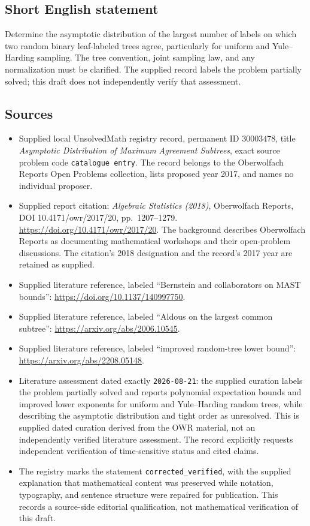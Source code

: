 \documentclass[11pt]{article}
\begin{document}
\subsection{Short English statement}
Determine the asymptotic distribution of the largest number of labels on which two random binary leaf-labeled trees agree, particularly for uniform and Yule--Harding sampling. The tree convention, joint sampling law, and any normalization must be clarified. The supplied record labels the problem partially solved; this draft does not independently verify that assessment.
\subsection{Sources}
\begin{itemize}
\item Supplied local UnsolvedMath registry record, permanent ID \(30003478\), title \emph{Asymptotic Distribution of Maximum Agreement Subtrees}, exact source problem code \texttt{catalogue entry}. The record belongs to the Oberwolfach Reports Open Problems collection, lists proposed year 2017, and names no individual proposer.
\item Supplied report citation: \emph{Algebraic Statistics (2018)}, Oberwolfach Reports, DOI 10.4171/owr/2017/20, pp.\ 1207--1279. \url{https://doi.org/10.4171/owr/2017/20}. The background describes Oberwolfach Reports as documenting mathematical workshops and their open-problem discussions. The citation's 2018 designation and the record's 2017 year are retained as supplied.
\item Supplied literature reference, labeled ``Bernstein and collaborators on MAST bounds'': \url{https://doi.org/10.1137/140997750}.
\item Supplied literature reference, labeled ``Aldous on the largest common subtree'': \url{https://arxiv.org/abs/2006.10545}.
\item Supplied literature reference, labeled ``improved random-tree lower bound'': \url{https://arxiv.org/abs/2208.05148}.
\item Literature assessment dated exactly \texttt{2026-08-21}: the supplied curation labels the problem partially solved and reports polynomial expectation bounds and improved lower exponents for uniform and Yule--Harding random trees, while describing the asymptotic distribution and tight order as unresolved. This is supplied dated curation derived from the OWR material, not an independently verified literature assessment. The record explicitly requests independent verification of time-sensitive status and cited claims.
\item The registry marks the statement \texttt{corrected\_verified}, with the supplied explanation that mathematical content was preserved while notation, typography, and sentence structure were repaired for publication. This records a source-side editorial qualification, not mathematical verification of this draft.
\end{itemize}
\end{document}
